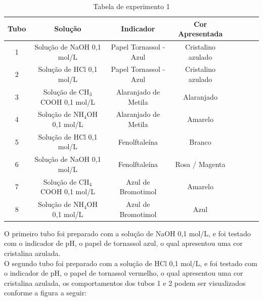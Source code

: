         \begin{table}[h]\label{tab:tubos}
            \label{tab:experimento1}
            \centering
            \begin{tabular}{|c|c|c|c|c|c|c|c|}
                \hline
                \textbf{Tubo} & \textbf{Solução} & \textbf{Indicador} & \textbf{Cor Apresentada}\\
                \hline
                1 & Solução de NaOH 0,1 mol/L & Papel Tornassol - Azul & Cristalino azulado \\
                \hline
                2 & Solução de HCl 0,1 mol/L & Papel Tornassol - Azul & Cristalino azulado \\
                \hline
                3 & Solução de CH$_3$COOH 0,1 mol/L & Alaranjado de Metila & Alaranjado\\
                \hline
                4 & Solução de NH$_4$OH 0,1 mol/L & Alaranjado de Metila & Amarelo \\
                \hline
                5 & Solução de HCl 0,1 mol/L & Fenolftaleína & Branco \\
                \hline
                6 & Solução de NaOH 0,1 mol/L & Fenolftaleína & Rosa / Magenta \\
                \hline
                7 & Solução de CH$_4$COOH 0,1 mol/L & Azul de Bromotimol & Amarelo \\
                \hline
                8 & Solução de NH$_4$OH 0,1 mol/L & Azul de Bromotimol & Azul \\
                \hline
            \end{tabular}
            \caption{Tabela de experimento 1}
        \end{table}

        \indent O primeiro tubo foi preparado com a solução de NaOH 0,1 mol/L, e foi testado com o indicador de pH, o papel de tornassol azul, o qual apresentou uma cor cristalina azulada.\\

        \indent O segundo tubo foi preparado com a solução de HCl 0,1 mol/L, e foi testado com o indicador de pH, o papel de tornassol vermelho, o qual apresentou uma cor cristalina azulada, os comportamentos dos tubos 1 e 2 podem ser visualizados conforme a figura a seguir:\\

